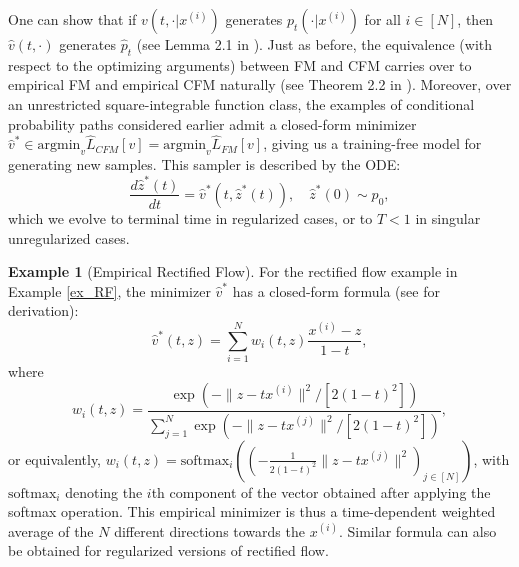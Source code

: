 \documentclass[a4paper,11pt]{article}
\theoremstyle{plain}
\theoremstyle{definition}
\newtheorem{exampleinner}[theoreminner]{Example}
\newenvironment{example}[1][]
  {\begin{mdframed}[style=examplestyle]\begin{exampleinner}[#1]}
  {\end{exampleinner}\end{mdframed}}
\begin{document}
One can show that if $v(t, \cdot | x^{(i)})$ generates $p_t(\cdot | x^{(i)})$ for all $i \in [N]$, then $\hat{v}(t, \cdot)$ generates $\hat{p}_t$ (see Lemma 2.1 in \cite{kunkel2025minimax}).
Just as before, the equivalence (with respect to the optimizing arguments) between FM and CFM carries over to empirical FM and empirical CFM naturally (see Theorem 2.2 in \cite{kunkel2025minimax}). Moreover, over an unrestricted square-integrable function class, the examples of conditional probability paths considered earlier admit a closed-form minimizer $\hat{v}^* \in \text{argmin}_v \hat{L}_{CFM}[v] = \text{argmin}_v \hat{L}_{FM}[v]$, giving us a training-free model for generating new samples. This sampler is described by the ODE: 
\begin{equation} \label{eq_closedformsampler}
    \frac{d \hat{z}^*(t)}{dt} = \hat{v}^*(t, \hat{z}^*(t)), \quad \hat{z}^*(0) \sim p_0,
\end{equation}
which we evolve to terminal time in regularized cases, or to \(T<1\) in singular unregularized cases.


\begin{example}[Empirical Rectified Flow] For the rectified flow example in Example \ref{ex_RF}, the minimizer $\hat{v}^*$ has a closed-form formula (see \cite{bertrand2025closed} for derivation):
\begin{equation} \label{eq_empRF}
    \hat{v}^*(t, z) = \sum_{i=1}^N w_i(t, z) \frac{x^{(i)}-z}{1-t},
\end{equation}
where 
\[
w_i(t,z)
=
\frac{\exp\!\left(-\|z-tx^{(i)}\|^2/[2(1-t)^2]\right)}
{\sum_{j=1}^N \exp\!\left(-\|z-tx^{(j)}\|^2/[2(1-t)^2]\right)},
\]
or equivalently,
$w_i(t, z) = \text{softmax}_i\left(\left(-\frac{1}{2(1-t)^2}\|z- t x^{(j)}\|^2  \right)_{j \in [N]} \right)$, with  $\text{softmax}_i$ denoting the $i$th component of the vector obtained after applying the softmax operation. This empirical minimizer is thus a time-dependent weighted average of the $N$ different directions towards the $x^{(i)}$. Similar formula can also be obtained for regularized versions of rectified flow.
\end{example}
\end{document}
